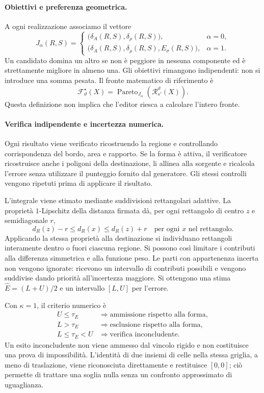 \documentclass[11pt,a4paper]{article}
\newcommand{\Pareto}{\operatorname{Pareto}}
\begin{document}
\paragraph{Obiettivi e preferenza geometrica.}
A ogni realizzazione associamo il vettore
\[
\boxed{J_\alpha(R,S)=
\begin{cases}
\bigl(\delta_A(R,S),\delta_\rho(R,S)\bigr),&\alpha=0,\\
\bigl(\delta_A(R,S),\delta_\rho(R,S),E_\sigma(R,S)\bigr),&\alpha=1.
\end{cases}}
\]
Un candidato domina un altro se non è peggiore in nessuna componente ed è strettamente migliore in almeno una. Gli obiettivi rimangono indipendenti: non si introduce una somma pesata. Il fronte matematico di riferimento è
\[
\mathcal F^{\star}_{\vartheta}(X)=
\Pareto_{J_\alpha}\!\left(\mathcal R_{s'}^{\vartheta}(X)\right).
\]
Questa definizione non implica che l'editor riesca a calcolare l'intero fronte.

\paragraph{Verifica indipendente e incertezza numerica.}
Ogni risultato viene verificato ricostruendo la regione e controllando corrispondenza del bordo, area e rapporto. Se la forma è attiva, il verificatore ricostruisce anche i poligoni della destinazione, li allinea alla sorgente e ricalcola l'errore senza utilizzare il punteggio fornito dal generatore. Gli stessi controlli vengono ripetuti prima di applicare il risultato.

L'integrale viene stimato mediante suddivisioni rettangolari adattive. La proprietà $1$-Lipschitz della distanza firmata dà, per ogni rettangolo di centro $z$ e semidiagonale $r$,
\[
d_R(z)-r\leq d_R(x)\leq d_R(z)+r
\quad\text{per ogni }x\text{ nel rettangolo}.
\]
Applicando la stessa proprietà alla destinazione si individuano rettangoli interamente dentro o fuori ciascuna regione. Si possono così limitare i contributi alla differenza simmetrica e alla funzione peso. Le parti con appartenenza incerta non vengono ignorate: ricevono un intervallo di contributi possibili e vengono suddivise dando priorità all'incertezza maggiore. Si ottengono una stima $\widehat E=(L+U)/2$ e un intervallo $[L,U]$ per l'errore.

Con $\kappa=1$, il criterio numerico è
\[
\begin{array}{ll}
U\leq\tau_E &\Longrightarrow\text{ammissione rispetto alla forma},\\
L>\tau_E &\Longrightarrow\text{esclusione rispetto alla forma},\\
L\leq\tau_E<U &\Longrightarrow\text{verifica inconcludente}.
\end{array}
\]
Un esito inconcludente non viene ammesso dal vincolo rigido e non costituisce una prova di impossibilità. L'identità di due insiemi di celle nella stessa griglia, a meno di traslazione, viene riconosciuta direttamente e restituisce $[0,0]$; ciò permette di trattare una soglia nulla senza un confronto approssimato di uguaglianza.
\end{document}
